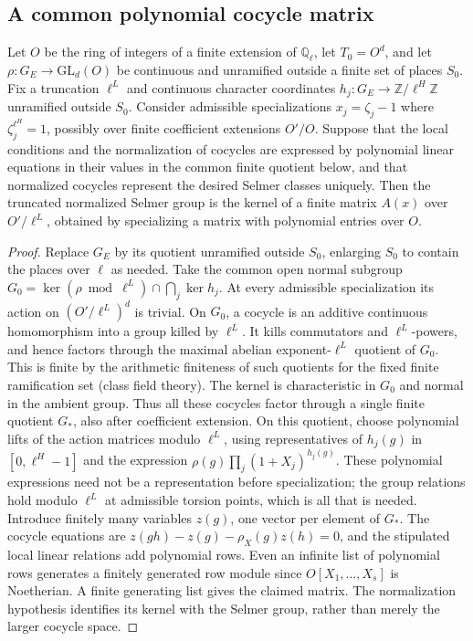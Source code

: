 \documentclass[11pt,a4paper]{article}
\begin{document}
\subsection{A common polynomial cocycle matrix}
\begin{proposition}\label{prop:selmer}
Let $O$ be the ring of integers of a finite extension of $\mathbb Q_\ell$, let $T_0=O^d$, and let $\rho:G_E\to\mathrm{GL}_d(O)$ be continuous and unramified outside a finite set of places $S_0$. Fix a truncation $\ell^L$ and continuous character coordinates $h_j:G_E\to\mathbb Z/\ell^H\mathbb Z$ unramified outside $S_0$. Consider admissible specializations $x_j=\zeta_j-1$ where $\zeta_j^{\ell^H}=1$, possibly over finite coefficient extensions $O'/O$. Suppose that the local conditions and the normalization of cocycles are expressed by polynomial linear equations in their values in the common finite quotient below, and that normalized cocycles represent the desired Selmer classes uniquely. Then the truncated normalized Selmer group is the kernel of a finite matrix $A(x)$ over $O'/\ell^L$, obtained by specializing a matrix with polynomial entries over $O$.
\end{proposition}
\begin{proof}
Replace $G_E$ by its quotient unramified outside $S_0$, enlarging $S_0$ to contain the places over $\ell$ as needed. Take the common open normal subgroup $G_0=\ker(\rho\bmod\ell^L)\cap\bigcap_j\ker h_j$. At every admissible specialization its action on $(O'/\ell^L)^d$ is trivial. On $G_0$, a cocycle is an additive continuous homomorphism into a group killed by $\ell^L$. It kills commutators and $\ell^L$-powers, and hence factors through the maximal abelian exponent-$\ell^L$ quotient of $G_0$. This is finite by the arithmetic finiteness of such quotients for the fixed finite ramification set (class field theory). The kernel is characteristic in $G_0$ and normal in the ambient group. Thus all these cocycles factor through a single finite quotient $G_*$, also after coefficient extension. On this quotient, choose polynomial lifts of the action matrices modulo $\ell^L$, using representatives of $h_j(g)$ in $[0,\ell^H-1]$ and the expression $\rho(g)\prod_j(1+X_j)^{h_j(g)}$. These polynomial expressions need not be a representation before specialization; the group relations hold modulo $\ell^L$ at admissible torsion points, which is all that is needed. Introduce finitely many variables $z(g)$, one vector per element of $G_*$. The cocycle equations are $z(gh)-z(g)-\rho_X(g)z(h)=0$, and the stipulated local linear relations add polynomial rows. Even an infinite list of polynomial rows generates a finitely generated row module since $O[X_1,\ldots,X_s]$ is Noetherian. A finite generating list gives the claimed matrix. The normalization hypothesis identifies its kernel with the Selmer group, rather than merely the larger cocycle space.
\end{proof}
\end{document}
